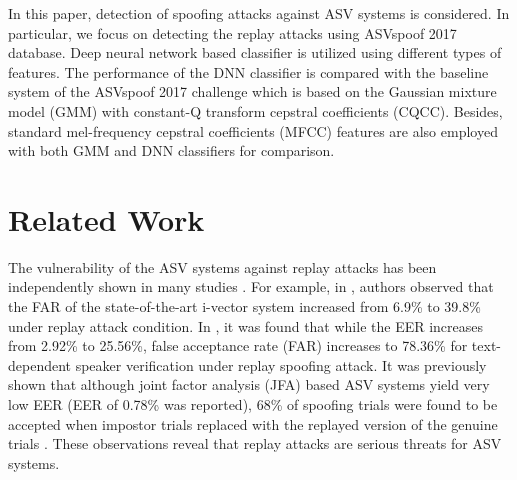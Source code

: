 \documentclass{article}
\begin{document}
In this paper, detection of spoofing attacks against ASV systems is considered. In particular, we focus on detecting
the replay attacks using ASVspoof 2017 database. Deep neural network based classifier is utilized using different
types of features. The performance of the DNN classifier is compared with the baseline system of the ASVspoof 2017
challenge which is based on the Gaussian mixture model (GMM) with constant-Q transform cepstral coefficients (CQCC).
Besides, standard mel-frequency cepstral coefficients (MFCC) features are also employed with both GMM and DNN
classifiers for comparison.

\section{Related Work}
\label{sec:related_work}
The vulnerability of the ASV systems against replay attacks has been independently shown in many studies
\cite{ergunay2015vulnerability, wu2016study,villalba2010speaker}. For example, in \cite{ergunay2015vulnerability},
authors observed that the FAR of the state-of-the-art i-vector system increased from 6.9\% to 39.8\% under replay
attack condition. In \cite{wu2016study}, it was found that while the EER increases from 2.92\% to 25.56\%, false
acceptance rate (FAR) increases to 78.36\% for text-dependent speaker verification under replay spoofing attack. It was
previously shown that although joint factor analysis (JFA) based ASV systems yield very low EER (EER of 0.78\% was
reported), 68\% of spoofing trials were found to be accepted when impostor trials replaced with the replayed version
of the genuine trials \cite{villalba2010speaker}. These observations reveal that replay attacks are serious threats for
ASV systems.
\end{document}
